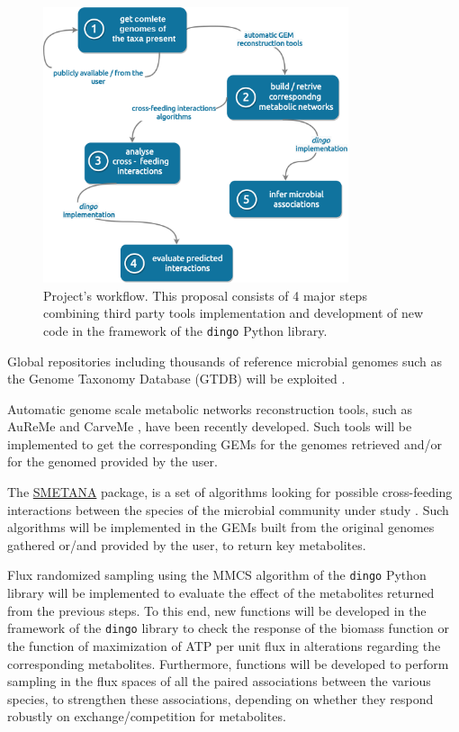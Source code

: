 \documentclass{article}
\begin{document}
\begin{figure}[h]
   \label{methods}
      \centering
      \includegraphics[width=0.8\textwidth]{proposal_fig.png}
      \caption{Project's workflow. This proposal consists of 4 major steps combining third party tools implementation and development of new code in the framework of the \texttt{dingo} Python library.}
\end{figure}



Global repositories including thousands of reference microbial genomes such as 
the Genome Taxonomy Database (GTDB) will be exploited \cite{parks2018standardized, parks2020complete}. 

Automatic genome scale metabolic networks reconstruction tools, 
such as AuReMe \cite{aite2018traceability} and CarveMe \cite{machado2018fast}, have been recently developed. Such tools will be implemented to get the corresponding GEMs 
for the genomes retrieved and/or for the genomed provided by the user. 

The \href{https://smetana.readthedocs.io/en/latest/algorithms.html}{SMETANA} package,
is a set of algorithms looking for possible cross-feeding interactions
between the species of the microbial community under study \cite{zelezniak2015metabolic}.
Such algorithms will be implemented in the GEMs built from the original genomes 
gathered or/and provided by the user, to return key metabolites. 

Flux randomized sampling using the MMCS algorithm of the \texttt{dingo} Python library 
will be implemented to evaluate the effect of the metabolites returned from the previous steps. 
To this end, new functions will be developed in the framework of the \texttt{dingo} library
to check the response of the biomass function \cite{feist2010biomass} or the function of maximization of ATP per unit flux \cite{schuetz2007systematic} in alterations regarding the corresponding metabolites. 
Furthermore, functions will be developed to perform sampling in the flux spaces of all the paired associations between the various species, to strengthen these associations, depending on whether they respond robustly on exchange/competition for metabolites. 
\end{document}
